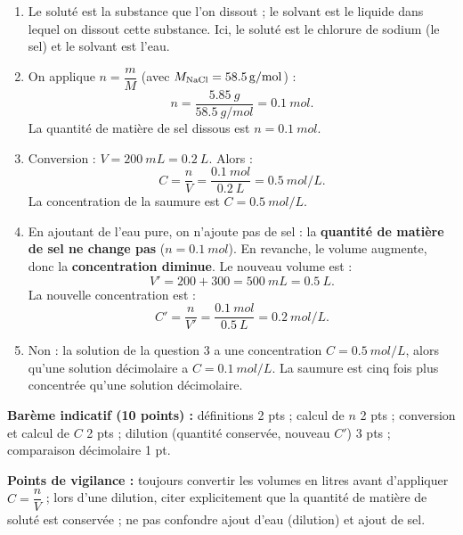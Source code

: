 \documentclass[11pt]{article}
\newcommand{\cle}[1]{{\popxbold\color{popdark}#1}}
\begin{document}
\begin{corrige}
\begin{enumerate}
\item Le \cle{soluté} est la substance que l'on dissout ; le \cle{solvant} est le liquide dans lequel on dissout cette substance. Ici, le soluté est le chlorure de sodium  (le sel) et le solvant est l'eau.
\item On applique $n = \dfrac{m}{M}$ (avec $M_{\ce{NaCl}} = \SI{58,5}{g/mol}$) :
\[ n = \frac{\SI{5,85}{g}}{\SI{58,5}{g/mol}} = \SI{0,1}{mol}. \]
La quantité de matière de sel dissous est $\boxed{n = \SI{0,1}{mol}}$.
\item Conversion : $V = \SI{200}{mL} = \SI{0,2}{L}$. Alors :
\[ C = \frac{n}{V} = \frac{\SI{0,1}{mol}}{\SI{0,2}{L}} = \SI{0,5}{mol/L}. \]
La concentration de la saumure est $\boxed{C = \SI{0,5}{mol/L}}$.
\item En ajoutant de l'eau pure, on n'ajoute pas de sel : la \textbf{quantité de matière de sel ne change pas} ($n = \SI{0,1}{mol}$). En revanche, le volume augmente, donc la \textbf{concentration diminue}. Le nouveau volume est :
\[ V' = 200 + 300 = \SI{500}{mL} = \SI{0,5}{L}. \]
La nouvelle concentration est :
\[ C' = \frac{n}{V'} = \frac{\SI{0,1}{mol}}{\SI{0,5}{L}} = \SI{0,2}{mol/L}. \]
\item Non : la solution de la question 3 a une concentration $C = \SI{0,5}{mol/L}$, alors qu'une solution décimolaire a $C = \SI{0,1}{mol/L}$. La saumure est cinq fois plus concentrée qu'une solution décimolaire.
\end{enumerate}
\textbf{Barème indicatif (10 points) :} définitions 2 pts ; calcul de $n$ 2 pts ; conversion et calcul de $C$ 2 pts ; dilution (quantité conservée, nouveau $C'$) 3 pts ; comparaison décimolaire 1 pt.

\textbf{Points de vigilance :} toujours convertir les volumes en litres avant d'appliquer $C = \dfrac{n}{V}$ ; lors d'une dilution, citer explicitement que la quantité de matière de soluté est conservée ; ne pas confondre ajout d'eau (dilution) et ajout de sel.
\end{corrige}
\end{document}
